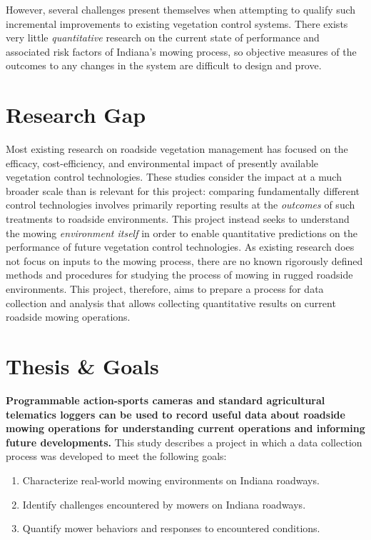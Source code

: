 \documentclass[
]{article}
\providecommand{\tightlist}{%
  \setlength{\itemsep}{0pt}\setlength{\parskip}{0pt}}
\begin{document}
However, several challenges present themselves when attempting to
qualify such incremental improvements to existing vegetation control
systems. There exists very little \emph{quantitative} research on the
current state of performance and associated risk factors of Indiana's
mowing process, so objective measures of the outcomes to any changes in
the system are difficult to design and prove.

\section{Research Gap}\label{research-gap}

Most existing research on roadside vegetation management has focused on
the efficacy, cost-efficiency, and environmental impact of presently
available vegetation control technologies. These studies consider the
impact at a much broader scale than is relevant for this project:
comparing fundamentally different control technologies involves
primarily reporting results at the \emph{outcomes} of such treatments to
roadside environments. This project instead seeks to understand the
mowing \emph{environment itself} in order to enable quantitative
predictions on the performance of future vegetation control
technologies. As existing research does not focus on inputs to the
mowing process, there are no known rigorously defined methods and
procedures for studying the process of mowing in rugged roadside
environments. This project, therefore, aims to prepare a process for
data collection and analysis that allows collecting quantitative results
on current roadside mowing operations.

\section{Thesis \& Goals}\label{thesis-goals}

\textbf{Programmable action-sports cameras and standard agricultural
telematics loggers can be used to record useful data about roadside
mowing operations for understanding current operations and informing
future developments.} This study describes a project in which a data
collection process was developed to meet the following goals:

\begin{enumerate}
\def\labelenumi{\arabic{enumi}.}
\tightlist
\item
  Characterize real-world mowing environments on Indiana roadways.
\item
  Identify challenges encountered by mowers on Indiana roadways.
\item
  Quantify mower behaviors and responses to encountered conditions.
\end{enumerate}
\end{document}
